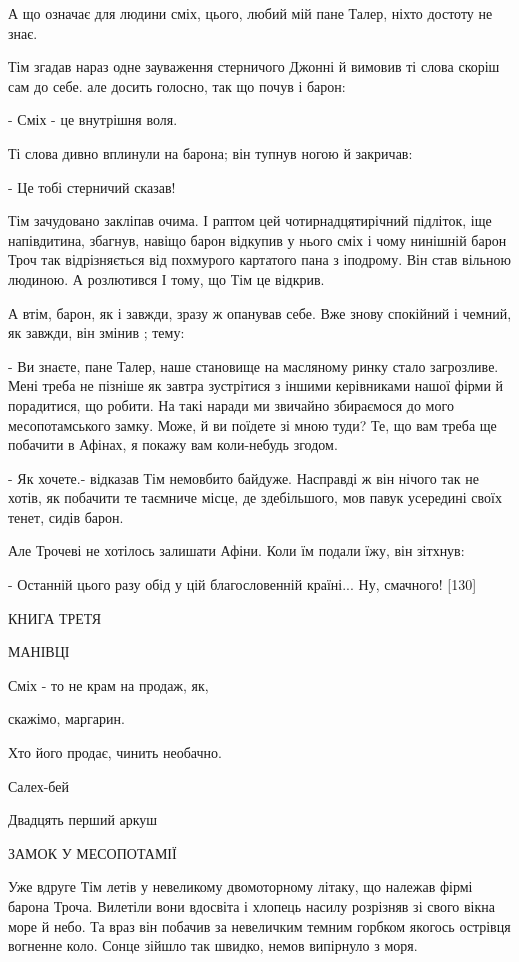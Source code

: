 А що означає для людини сміх, цього, любий мій пане Талер, ніхто достоту не знає.

Тім згадав нараз одне зауваження стерничого Джонні й вимовив ті слова скоріш сам до себе. але досить голосно, так що почув і барон:

- Сміх - це внутрішня воля.

Ті слова дивно вплинули на барона; він тупнув ногою й закричав:

- Це тобі стерничий сказав!

Тім зачудовано закліпав очима. І раптом цей чотирнадцятирічний підліток, іще напівдитина, збагнув, навіщо барон відкупив у нього сміх і чому нинішній барон Троч так відрізняється від похмурого картатого пана з іподрому. Він став вільною людиною. А розлютився І тому, що Тім це відкрив.

А втім, барон, як і завжди, зразу ж опанував себе. Вже знову спокійний і чемний, як завжди, він змінив ; тему:

- Ви знаєте, пане Талер, наше становище на масляному ринку стало загрозливе. Мені треба не пізніше як завтра зустрітися з іншими керівниками нашої фірми й порадитися, що робити. На такі наради ми звичайно збираємося до мого месопотамського замку. Може, й ви поїдете зі мною туди? Те, що вам треба ще побачити в Афінах, я покажу вам коли-небудь згодом.

- Як хочете.- відказав Тім немовбито байдуже. Насправді ж він нічого так не хотів, як побачити те таємниче місце, де здебільшого, мов павук усередині своїх тенет, сидів барон.

Але Трочеві не хотілось залишати Афіни. Коли їм подали їжу, він зітхнув:

- Останній цього разу обід у цій благословенній країні... Ну, смачного! [130]

КНИГА ТРЕТЯ

МАНІВЦІ

Сміх - то не крам на продаж, як,

скажімо, маргарин.

Хто його продає, чинить необачно.

Салех-бей

Двадцять перший аркуш

ЗАМОК У МЕСОПОТАМІЇ

Уже вдруге Тім летів у невеликому двомоторному літаку, що належав фірмі барона Троча. Вилетіли вони вдосвіта і хлопець насилу розрізняв зі свого вікна море й небо. Та враз він побачив за невеличким темним горбком якогось острівця вогненне коло. Сонце зійшло так швидко, немов випірнуло з моря.

